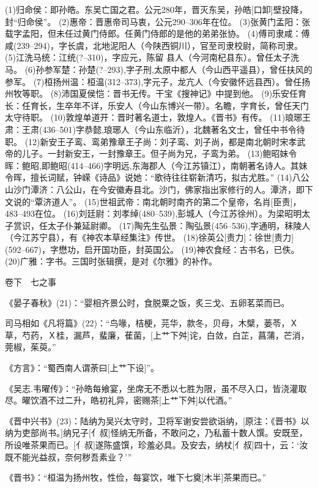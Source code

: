 \documentclass[12pt,UTF8]{ctexbook}
\begin{document}
(1)归命侯：即孙皓。东吴亡国之君。公元280年，晋灭东吴，孙皓[口卸]壁投降，封“归命侯”。
(2)惠帝：晋惠帝司马衷，公元290--306年在位。
(3)张黄门孟阳：张载字孟阳，但未任过黄门侍郎。任黄门侍郎的是他的弟弟张协。
(4)傅司隶咸：傅咸(239--294)，字长虞，北地泥阳人（今陕西铜川），官至司隶校尉，简称司隶。
(5)江洗马统：江统(?--310)，字应元，陈留 县人（今河南杞县东）。曾任太子洗马。
(6)孙参军楚：孙楚(?--293),字子刑,太原中都人（今山西平遥县），曾任扶风的参军。
(7)桓扬州温：桓温(312--373),字元子，龙亢人（今安徽怀远县西）。曾任扬州牧等职。
(8)沛国夏侯恺：晋书无传。干宝《搜神记》中提到他。
(9)乐安任育长：任育长，生卒年不详，乐安人（今山东博兴一带）。名瞻，字育长，曾任天门太守待职。
(10)敦煌单道开：晋时著名道士，敦煌人。《晋书》有传。
(11)琅琊王肃：王肃(436--501)字恭懿,琅琊人（今山东临沂），北魏著名文士，曾任中书令待职。
(12)新安王子鸾、鸾弟豫章王子尚：刘子鸾、刘子尚，都是南北朝时宋孝武帝的儿子。一封新安王，一封豫章王。但子尚为兄，子鸾为弟。
(13)鲍昭妹令晖：鲍昭,即鲍昭(414--466)字明远,东海郡人（今江苏镇江），南朝著名诗人。其妹令晖，擅长词赋，钟嵘《诗品》说她：“歌待往往崭新清巧，拟古尤胜。”
(14)八公山沙门潭济：八公山，在今安徽寿县北。沙门，佛家指出家修行的人。潭济，即下文说的“覃济道人”。
(15)世祖武帝：南北朝时南齐的第二个皇帝，名肖[臣责]，483--493在位。
(16)刘廷尉：刘孝绰(480--539),彭城人（今江苏徐州）。为梁昭明太子赏识，任太子仆兼延尉卿。
(17)陶先生弘景：陶弘景(456--536),字通明，秣陵人（今江苏宁县），有《神农本草经集注》传世。
(18)徐英公[责力]：徐世[责力](592--667)，字懋功，启开国功臣，封英国公。
(19)神农食经：古书名，已佚。
(20)广雅：字书。三国时张辑撰，是对《尔雅》的补作。

卷下　七之事

《晏子春秋》(21)：“婴相齐景公时，食脱粟之饭，炙三戈、五卵茗菜而已。

司马相如《凡将篇》(22)：“鸟喙，桔梗，芫华，款冬，贝母，木檗，蒌苓，Ｘ草，芍药，Ｘ桂，漏芦，蜚廉，萑菌，[上艹下舛]诧，白敛，白芷，菖蒲，芒消，莞椒，茱萸。”

《方言》：“蜀西南人谓荼曰[上艹下设]”。

《吴志.韦曜传》：“孙皓每飨宴，坐席无不悉以七胜为限，虽不尽入口，皆浇灌取尽。曜饮酒不过二升，皓初礼异，密赐茶[上艹下舛]以代酒。”

《晋中兴书》(23)：陆纳为吴兴太守时，卫将军谢安尝欲诣纳，[原注：《晋书》以纳为吏部尚书。]纳兄子[亻叔]怪纳无所备，不敢问之，乃私蓄十数人馔。安既至，所设唯茶果而已。[亻叔]遂陈盛馔，珍羞必具。及安去，纳杖[亻叔]四十，云：‘汝既不能光益叔，奈何秽吾素业？’”

《晋书》：“桓温为扬州牧，性俭，每宴饮，唯下七奠[木半]茶果而已。”
\end{document}
